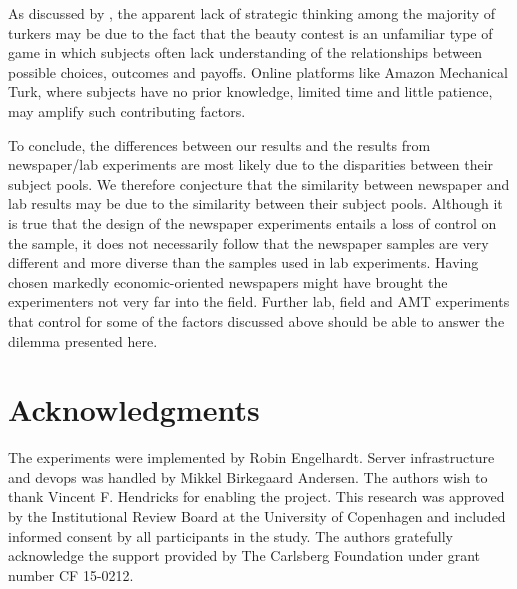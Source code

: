 \documentclass[12pt,review]{elsarticle}
\begin{document}
As discussed by \citet{chou2009control}, the apparent lack of strategic thinking among the majority of turkers may be due to the fact that the beauty contest is an unfamiliar type of game in which subjects often lack understanding of the relationships between possible choices, outcomes and payoffs. Online platforms like Amazon Mechanical Turk, where subjects have no prior knowledge, limited time and little patience, may amplify such contributing factors.

To conclude, the differences between our results and the results from newspaper/lab experiments are most likely due to the disparities between their subject pools. We therefore conjecture that the similarity between newspaper and lab results may be due to the similarity between their subject pools. Although it is true that the design of the newspaper experiments entails a loss of control on the sample, it does not necessarily follow that the newspaper samples are very different and more diverse than the samples used in lab experiments. Having chosen markedly economic-oriented newspapers might have brought the experimenters not very far into the field. Further lab, field and AMT experiments that control for some of the factors discussed above should be able to answer the dilemma presented here.

\section{Acknowledgments}
\noindent
The experiments were implemented by Robin Engelhardt. Server infrastructure and devops was handled by Mikkel Birkegaard Andersen. The authors wish to thank Vincent F. Hendricks for enabling the project. This research was approved by the Institutional Review Board at the University of Copenhagen and included informed consent by all participants in the study. The authors gratefully acknowledge the support provided by The Carlsberg Foundation under grant number CF 15-0212.


  

\newpage
\appendix
\setcounter{page}{1}

\end{document}
